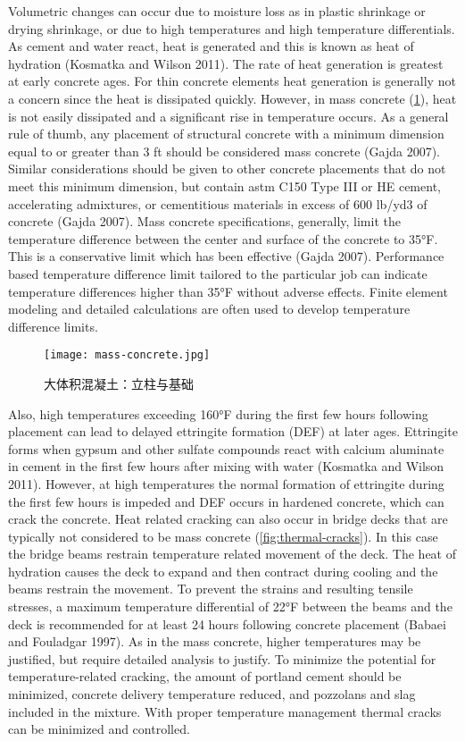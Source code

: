 Volumetric changes can occur due to moisture loss as in plastic shrinkage or drying shrinkage, or due to high temperatures and high temperature differentials. As cement and water react, heat is generated and this is known as heat of hydration (Kosmatka and Wilson 2011). The rate of heat generation is greatest at early concrete ages. For thin concrete elements heat generation is generally not a concern since the heat is dissipated quickly. However, in mass concrete (\cref{fig:mass-concrete}), heat is not easily dissipated and a significant rise in temperature occurs. As a general rule of thumb, any placement of structural concrete with a minimum dimension equal to or greater than 3 ft should be considered mass concrete (Gajda 2007). Similar considerations should be given to other concrete placements that do not meet this minimum dimension, but contain \acrshort*{astm} C150 Type III or HE cement, accelerating admixtures, or cementitious materials in excess of 600 lb/yd3 of concrete (Gajda 2007). Mass concrete specifications, generally, limit the temperature difference between the center and surface of the concrete to 35°F. This is a conservative limit which has been effective (Gajda 2007). Performance based temperature difference limit tailored to the particular job can indicate temperature differences higher than 35°F without adverse effects. Finite element modeling and detailed calculations are often used to develop temperature difference limits.

\begin{figure}
  \texttt{[image: mass-concrete.jpg]}
  \caption{大体积混凝土：立柱与基础}
  \label{fig:mass-concrete}
\end{figure}

Also, high temperatures exceeding 160°F during the first few hours following placement can lead to delayed ettringite formation (DEF) at later ages. Ettringite forms when gypsum and other sulfate compounds react with calcium aluminate in cement in the first few hours after mixing with water (Kosmatka and Wilson 2011). However, at high temperatures the normal formation of ettringite during the first few hours is impeded and DEF occurs in hardened concrete, which can crack the concrete. Heat related cracking can also occur in bridge decks that are typically not considered to be mass concrete (\cref{fig:thermal-cracks}). In this case the bridge beams restrain temperature related movement of the deck. The heat of hydration causes the deck to expand and then contract during cooling and the beams restrain the movement. To prevent the strains and resulting tensile stresses, a maximum temperature differential of 22°F between the beams and the deck is recommended for at least 24 hours following concrete placement (Babaei and Fouladgar 1997). As in the mass concrete, higher temperatures may be justified, but require detailed analysis to justify. To minimize the potential for temperature-related cracking, the amount of portland cement should be minimized, concrete delivery temperature reduced, and pozzolans and slag included in the mixture. With proper temperature management thermal cracks can be minimized and controlled.

